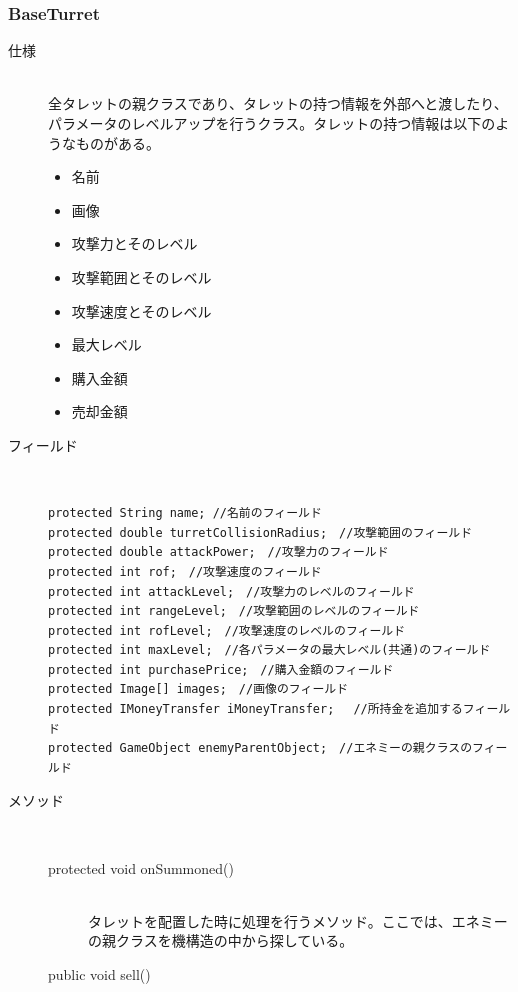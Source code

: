 \documentclass[11pt,a4j]{jarticle}
\begin{document}
\subsubsection{BaseTurret}
\begin{description}
    \item[仕様]\mbox{}\\
          全タレットの親クラスであり、タレットの持つ情報を外部へと渡したり、パラメータのレベルアップを行うクラス。タレットの持つ情報は以下のようなものがある。
          \begin{itemize}
              \item 名前
              \item 画像
              \item 攻撃力とそのレベル
              \item 攻撃範囲とそのレベル
              \item 攻撃速度とそのレベル
              \item 最大レベル
              \item 購入金額
              \item 売却金額
          \end{itemize}
    \item[フィールド]\mbox{}\\
          \begin{lstlisting}[numbers=none]
protected String name; //名前のフィールド
protected double turretCollisionRadius;　//攻撃範囲のフィールド
protected double attackPower;　//攻撃力のフィールド
protected int rof;　//攻撃速度のフィールド
protected int attackLevel;　//攻撃力のレベルのフィールド
protected int rangeLevel;　//攻撃範囲のレベルのフィールド
protected int rofLevel;　//攻撃速度のレベルのフィールド
protected int maxLevel;　//各パラメータの最大レベル(共通)のフィールド
protected int purchasePrice;　//購入金額のフィールド
protected Image[] images;　//画像のフィールド
protected IMoneyTransfer iMoneyTransfer;　 //所持金を追加するフィールド
protected GameObject enemyParentObject;　//エネミーの親クラスのフィールド
\end{lstlisting}
    \item[メソッド]\mbox{}\\
          \begin{description}
              \item[protected void onSummoned()]\mbox{}\\
                    タレットを配置した時に処理を行うメソッド。ここでは、エネミーの親クラスを機構造の中から探している。
              \item[public void sell()]\mbox{}\\

\end{description}
\end{description}
\end{document}

